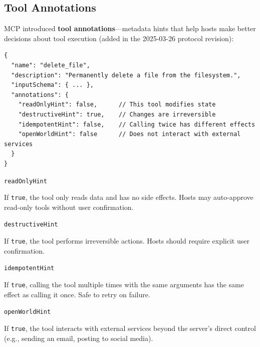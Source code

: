 \subsection{Tool Annotations}
\label{tool-annotations}

MCP introduced \textbf{tool annotations}---metadata hints that help hosts make better decisions about tool execution (added in the 2025-03-26 protocol revision):

\begin{lstlisting}[style=pythonstyle]
{
  "name": "delete_file",
  "description": "Permanently delete a file from the filesystem.",
  "inputSchema": { ... },
  "annotations": {
    "readOnlyHint": false,      // This tool modifies state
    "destructiveHint": true,    // Changes are irreversible
    "idempotentHint": false,    // Calling twice has different effects
    "openWorldHint": false      // Does not interact with external services
  }
}
\end{lstlisting}

\texttt{readOnlyHint}

If \texttt{true}, the tool only reads data and has no side effects. Hosts may auto-approve read-only tools without user confirmation.

\texttt{destructiveHint}

If \texttt{true}, the tool performs irreversible actions. Hosts should require explicit user confirmation.

\texttt{idempotentHint}

If \texttt{true}, calling the tool multiple times with the same arguments has the same effect as calling it once. Safe to retry on failure.

\texttt{openWorldHint}

If \texttt{true}, the tool interacts with external services beyond the server’s direct control (e.g., sending an email, posting to social media).

